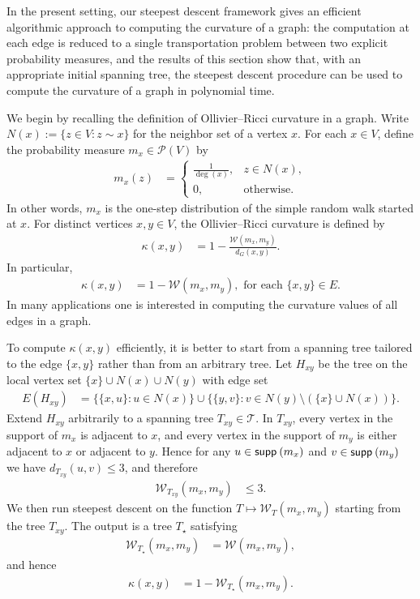 \documentclass[11pt,a4paper]{article}
\newcommand{\supp}{{\mathsf{supp }\hspace{.075cm}}}
\newcommand{\prob}{{\mathscr{P}}}
\newcommand{\wass}{{\mathcal{W}}}
\newcommand{\setoftrees}{{\mathcal{T}}}
\begin{document}
In the present setting, our steepest descent framework gives an efficient algorithmic approach to computing the curvature of a graph: the computation at each edge is reduced to a single transportation problem between two explicit probability measures, and the results of this section show that, with an appropriate initial spanning tree, the steepest descent procedure can be used to compute the curvature of a graph in polynomial time.

    We begin by recalling the definition of Ollivier--Ricci curvature in a graph. Write $N(x):=\{z\in V : z\sim x\}$ for the neighbor set of a vertex $x$. For each $x\in V$, define the probability measure $m_x\in\prob(V)$ by
        \begin{align*}
            m_x(z) &= \begin{cases}
                \frac{1}{\deg(x)}, & z\in N(x),\\
                0, & \text{otherwise}.
            \end{cases}
        \end{align*}
    In other words, $m_x$ is the one-step distribution of the simple random walk started at $x$. For distinct vertices $x,y\in V$, the Ollivier--Ricci curvature is defined by
        \begin{align*}
            \kappa(x,y) &= 1-\frac{\wass(m_x,m_y)}{d_G(x,y)}.
        \end{align*}
    In particular,
        \begin{align*}
            \kappa(x,y) &= 1-\wass(m_x,m_y),\text{ for each }\{x,y\}\in E.
        \end{align*}
    In many applications one is interested in computing the curvature values of all edges in a graph.
    
    To compute $\kappa(x,y)$ efficiently, it is better to start from a spanning tree tailored to the edge $\{x,y\}$ rather than from an arbitrary tree. Let $H_{xy}$ be the tree on the local vertex set $\{x\}\cup N(x)\cup N(y)$ with edge set
        \begin{align*}
            E(H_{xy}) &= \bigl\{\{x,u\}: u\in N(x)\bigr\}
            \cup \bigl\{\{y,v\}: v\in N(y)\setminus(\{x\}\cup N(x))\bigr\}.
        \end{align*}
    Extend $H_{xy}$ arbitrarily to a spanning tree $T_{xy}\in\setoftrees$. In $T_{xy}$, every vertex in the support of $m_x$ is adjacent to $x$, and every vertex in the support of $m_y$ is either adjacent to $x$ or adjacent to $y$. Hence for any $u\in\supp(m_x)$ and $v\in\supp(m_y)$ we have $d_{T_{xy}}(u,v)\le 3$, and therefore
        \begin{align*}
            \wass_{T_{xy}}(m_x,m_y) &\le 3.
        \end{align*}
    We then run steepest descent on the function $T\mapsto\wass_T(m_x,m_y)$ starting from the tree $T_{xy}$. The output is a tree $T_\star$ satisfying
        \begin{align*}
            \wass_{T_\star}(m_x,m_y) &= \wass(m_x,m_y),
        \end{align*}
    and hence
        \begin{align*}
            \kappa(x,y) &= 1-\wass_{T_\star}(m_x,m_y).
        \end{align*}
\end{document}
